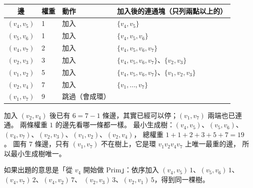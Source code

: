 \begin{pastsoln}
\begin{center}
\small
\begin{tabular}{clll}
\toprule
邊 & 權重 & 動作 & 加入後的連通塊（只列兩點以上的） \\
\midrule
$(v_4, v_5)$ & 1 & 加入 & $\{v_4, v_5\}$ \\
$(v_5, v_6)$ & 1 & 加入 & $\{v_4, v_5, v_6\}$ \\
$(v_4, v_7)$ & 2 & 加入 & $\{v_4, v_5, v_6, v_7\}$ \\
$(v_2, v_3)$ & 3 & 加入 & $\{v_4, v_5, v_6, v_7\}$、$\{v_2, v_3\}$ \\
$(v_1, v_2)$ & 5 & 加入 & $\{v_4, v_5, v_6, v_7\}$、$\{v_1, v_2, v_3\}$ \\
$(v_2, v_4)$ & 7 & 加入 & $\{v_1, \ldots, v_7\}$ \\
$(v_1, v_7)$ & 9 & 跳過（會成環） & \\
\bottomrule
\end{tabular}
\end{center}
加入 $(v_2, v_4)$ 後已有 $6 = 7 - 1$ 條邊，其實已經可以停；$(v_1, v_7)$ 兩端也已連通。 兩條權重 $1$ 的邊先看哪一條都一樣。 最小生成樹：$(v_4, v_5)$、$(v_5, v_6)$、$(v_4, v_7)$、$(v_2, v_3)$、$(v_1, v_2)$、$(v_2, v_4)$，
總權重 $1 + 1 + 2 + 3 + 5 + 7 = 19$。 圖有 $7$ 條邊，只有 $(v_1, v_7)$ 不在樹上，它是環 $v_1 v_2 v_4 v_7$ 上唯一最重的邊，
所以最小生成樹唯一。

如果出題的意思是「從 $v_4$ 開始做 Prim」：依序加入 $(v_4, v_5)\,1$、$(v_5, v_6)\,1$、$(v_4, v_7)\,2$、$(v_4, v_2)\,7$、
$(v_2, v_3)\,3$、$(v_2, v_1)\,5$，得到同一棵樹。
\end{pastsoln}
